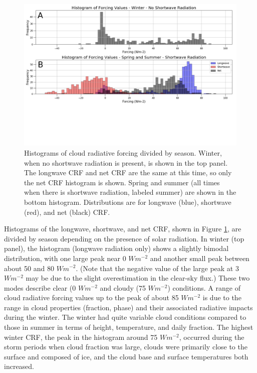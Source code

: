 \begin{figure}[H]
    \centering
    \includegraphics[width=1\linewidth]{figures/chapter4/ch2_f7.png}
    \caption[Histograms of cloud radiative forcing by season]{Histograms of cloud radiative forcing divided by season. Winter, when no shortwave radiation is present, is shown in the top panel. The longwave CRF and net CRF are the same at this time, so only the net CRF histogram is shown. Spring and summer (all times when there is shortwave radiation, labeled summer) are shown in the bottom histogram. Distributions are for longwave (blue), shortwave (red), and net (black) CRF.}
    \label{fig:crf_histo}
\end{figure}

Histograms of the longwave, shortwave, and net CRF, shown in Figure \ref{fig:crf_histo}, are divided by season depending on the presence of solar radiation. In winter (top panel), the histogram (longwave radiation only) shows a slightly bimodal distribution, with one large peak near 0 $W m^{-2}$ and another small peak between about 50 and 80 $W m^{-2}$. (Note that the negative value of the large peak at 3 $W m^{-2}$ may be due to the slight overestimation in the clear-sky flux.) These two modes describe clear (0 $W m^{-2}$ and cloudy (75 $W m^{-2}$) conditions. A range of cloud radiative forcing values up to the peak of about 85 $W m^{-2}$ is due to the range in cloud properties (fraction, phase) and their associated radiative impacts during the winter. The winter had quite variable cloud conditions compared to those in summer in terms of height, temperature, and daily fraction. The highest winter CRF, the peak in the histogram around 75 $W m^{-2}$, occurred during the storm periods when cloud fraction was large, clouds were primarily close to the surface and composed of ice, and the cloud base and surface temperatures both increased.  

